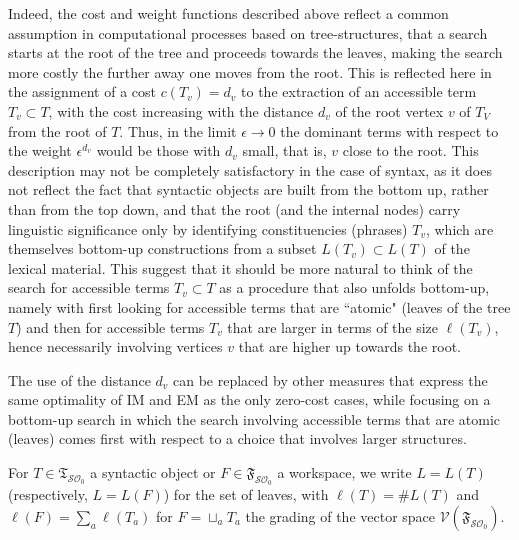 \documentclass[12pt]{amsart}
\numberwithin{equation}{section}
\def\cO{{\mathcal O}}
\def\cS{{\mathcal S}}
\def\cV{{\mathcal V}}
\def\fT{{\mathfrak T}}
\def\fF{{\mathfrak F}}
\begin{document}
  Indeed, the cost and weight functions
  described above reflect a common assumption in computational processes
  based on tree-structures, that a search starts at the root of the tree and
  proceeds towards the leaves, making the search more costly the further
  away one moves from the root. This is reflected here in the assignment
  of a cost $c(T_v)=d_v$ to the extraction of an accessible term $T_v\subset T$,
  with the cost increasing with the distance $d_v$ of the root vertex $v$ of $T_V$
  from the root of $T$. Thus, in the limit $\epsilon \to 0$ the dominant terms with
  respect to the weight $\epsilon^{d_v}$ would be those with $d_v$ small, 
  that is, $v$ close to the root. This description may not be
 completely satisfactory in the case of syntax, as it does not reflect
 the fact that syntactic objects are built from the bottom up, rather than from the
 top down, and that the root (and the internal nodes) carry linguistic significance only
 by identifying constituencies (phrases) $T_v$, which are themselves bottom-up constructions
 from a subset $L(T_v)\subset L(T)$ of the lexical material.  
 This suggest that it should be more natural to think of the search for 
 accessible terms $T_v \subset T$ as a procedure that also unfolds bottom-up, 
 namely with first looking for accessible
 terms that are ``atomic" (leaves of the tree $T$) and then for accessible terms $T_v$
 that are larger in terms of the size $\ell(T_v)$, hence necessarily 
 involving vertices $v$ that are higher up towards the root. 
  
  \smallskip
  
  The use of the distance $d_v$ can be
  replaced by other measures that express the same optimality of 
  IM and EM as the only zero-cost cases, while focusing on a
  bottom-up search in which the search involving accessible terms that
  are atomic (leaves) comes first with respect to a choice that
  involves larger structures. 
  
  \smallskip 
  
  For $T\in \fT_{\cS\cO_0}$ a syntactic object or $F\in \fF_{\cS\cO_0}$ a workspace, we write
  $L=L(T)$ (respectively, $L=L(F)$) for the set of leaves, with $\ell(T)=\# L(T)$ 
   and $\ell(F)=\sum_a \ell(T_a)$ for $F=\sqcup_a T_a$ the grading of
  the vector space $\cV(\fF_{\cS\cO_0})$. 
  
\end{document}
